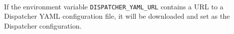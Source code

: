 
\noindent\\If the environment variable \texttt{DISPATCHER\_YAML\_URL} contains a URL to a 
Dispatcher YAML configuration file, it will be downloaded and set as the Dispatcher configuration.

